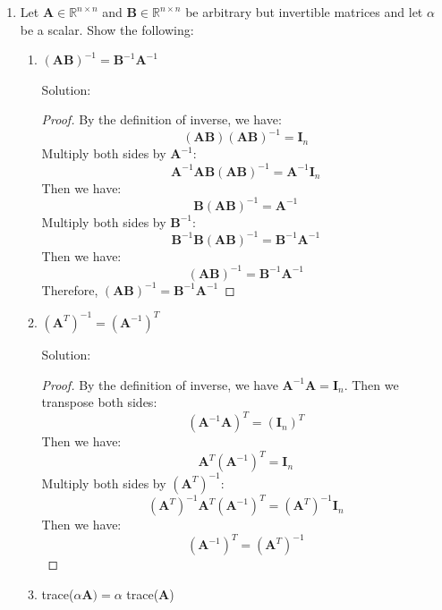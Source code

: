 \documentclass[12pt]{article}
\newcommand{\solu}{{\color{blue} Solution:}}
\newcommand{\Rbb}{\mathbb{R}}
\newcommand{\Upmb}{\pmb{U}}
\begin{document}
\begin{enumerate}
\begin{enumerate}
\begin{proof}
                        Thus, $||\Upmb \pmb{a}||_2^2$ = $||\pmb{a}||_2^2$.
                    \end{proof}
          \end{enumerate}

    \item Let $\pmb{A} \in \Rbb^{n\times n}$ and $\pmb{B} \in \Rbb^{n\times n}$ be arbitrary but invertible matrices and let $\alpha$ be a scalar. Show the following:

          \begin{enumerate}
              \item $(\pmb{A}\pmb{B})^{-1} = \pmb{B}^{-1}\pmb{A}^{-1}$

                    \solu

                    \begin{proof}
                        By the definition of inverse, we have: $$(\pmb{A}\pmb{B})(\pmb{A}\pmb{B})^{-1} = \pmb{I}_n$$
                        Multiply both sides by $\pmb{A}^{-1}$: $$\pmb{A}^{-1}\pmb{A}\pmb{B}(\pmb{A}\pmb{B})^{-1} = \pmb{A}^{-1}\pmb{I}_n$$
                        Then we have: $$\pmb{B}(\pmb{A}\pmb{B})^{-1} = \pmb{A}^{-1}$$
                        Multiply both sides by $\pmb{B}^{-1}$: $$\pmb{B}^{-1}\pmb{B}(\pmb{A}\pmb{B})^{-1} = \pmb{B}^{-1}\pmb{A}^{-1}$$
                        Then we have: $$(\pmb{A}\pmb{B})^{-1} = \pmb{B}^{-1}\pmb{A}^{-1}$$
                        Therefore, $(\pmb{A}\pmb{B})^{-1} = \pmb{B}^{-1}\pmb{A}^{-1}$
                    \end{proof}



              \item $(\pmb{A}^T)^{-1} = (\pmb{A}^{-1})^T$

                    \solu

                    \begin{proof}
                        By the definition of inverse, we have $\pmb{A}^{-1}\pmb{A} = \pmb{I}_n$. Then we transpose both sides:
                        $$(\pmb{A}^{-1}\pmb{A})^T = (\pmb{I}_n)^T$$
                        Then we have: $$\pmb{A}^T(\pmb{A}^{-1})^T = \pmb{I}_n$$
                        Multiply both sides by $(\pmb{A}^T)^{-1}$:
                        $$(\pmb{A}^T)^{-1}\pmb{A}^T(\pmb{A}^{-1})^T = (\pmb{A}^T)^{-1}\pmb{I}_n$$
                        Then we have: $$(\pmb{A}^{-1})^T = (\pmb{A}^T)^{-1}$$
                    \end{proof}

              \item trace($\alpha \pmb{A}) = \alpha$ trace($\pmb{A}$)


\end{enumerate}
\end{enumerate}
\end{document}
